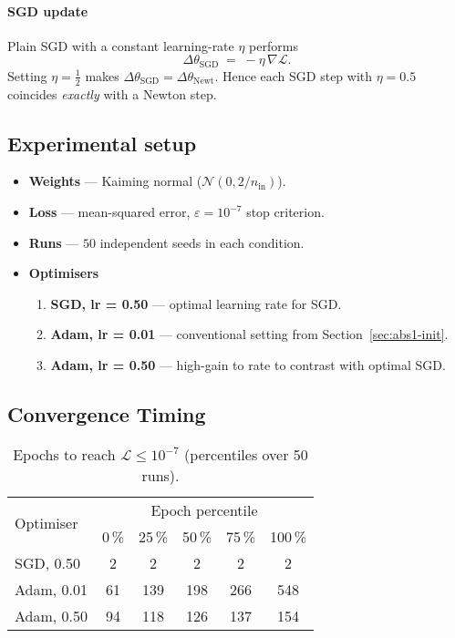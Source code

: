 \paragraph{SGD update}
Plain SGD with a constant learning-rate $\eta$ performs
\[
    \Delta\theta_{\text{SGD}}
    \;=\;
    -\eta\,\nabla\! \mathcal L.
\]
Setting \(\eta=\tfrac12\) makes \(\Delta\theta_{\text{SGD}} =
\Delta\theta_{\text{Newt}}\).  Hence each SGD step with
\(\eta=0.5\) coincides \emph{exactly} with a Newton step.

\subsection*{Experimental setup}
\begin{itemize}
    \item \textbf{Weights} — Kaiming normal ($\mathcal N(0,2/n_\text{in})$).
    \item \textbf{Loss} — mean-squared error, $\varepsilon=10^{-7}$ stop criterion.
    \item \textbf{Runs} — $50$ independent seeds in each condition.
    \item \textbf{Optimisers}  
        \begin{enumerate}
            \item \textbf{SGD, lr = 0.50} — optimal learning rate for SGD.
            \item \textbf{Adam, lr = 0.01} — conventional setting from Section~\ref{sec:abs1-init}.
            \item \textbf{Adam, lr = 0.50} — high-gain to rate to contrast with optimal SGD.
        \end{enumerate}
\end{itemize}

\subsection*{Convergence Timing}

\begin{table}[h]
\centering
\caption{Epochs to reach $\mathcal{L}\le10^{-7}$ (percentiles over 50 runs).}
\label{tab:abs1-opt-conv}
\begin{tabular}{lccccc}
\toprule
\multirow{2}{*}{Optimiser} &
\multicolumn{5}{c}{Epoch percentile} \\
\cmidrule(lr){2-6}
 & 0\,\% & 25\,\% & 50\,\% & 75\,\% & 100\,\% \\
\midrule
SGD,  0.50 & 2   & 2   & 2   & 2   & 2   \\ 
Adam, 0.01 & 61  & 139 & 198 & 266 & 548 \\
Adam, 0.50 & 94  & 118 & 126 & 137 & 154 \\
\bottomrule
\end{tabular}
\end{table}

